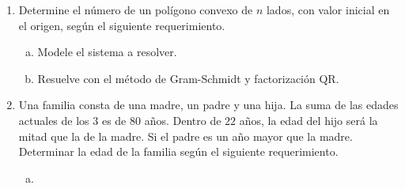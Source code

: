 \documentclass[
  spanish,
  8pt,
  utf8,
  xcolor=table,
  handout,
  aspectratio=169,
  professionalfonts,
  notheorems,
  mathserif,
]{beamer}
\begin{document}
\begin{frame}
\begin{enumerate}
\begin{multicols}{2}
\begin{enumerate}[a)]
				      \item

				            \begin{math}
					            f\left(x\right)=
					            x^{2}-2x+3
				            \end{math}.

				      \item

				            \begin{math}
					            f\left(x\right)=
					            \dfrac{1}{2}\cos\left(x\right)+
					            \dfrac{1}{3}\sin\left(2x\right)
				            \end{math}.

			      \end{enumerate}
		      \end{multicols}
		      Implemente un algoritmo.

		\item

		      Determine el número de un polígono convexo de $n$ lados,
		      con valor inicial en el origen, según el siguiente
		      requerimiento.

		      \begin{multicols}{2}
			      \begin{enumerate}[a)]
				      \item

				            Modele el sistema a resolver.

				      \item

				            Resuelve con el método de Gram-Schmidt y
				            factorización QR.
			      \end{enumerate}
		      \end{multicols}

		\item

		      Una familia consta de una madre, un padre y una hija.
		      La suma de las edades actuales de los $3$ es de $80$ años.
		      Dentro de $22$ años, la edad del hijo será la mitad que la
		      de la madre.
		      Si el padre es un año mayor que la madre.
		      Determinar la edad de la familia según el siguiente
		      requerimiento.

		      \begin{multicols}{2}
			      \begin{enumerate}[a)]
				      \item


\end{enumerate}
\end{multicols}
\end{enumerate}
\end{frame}
\end{document}
